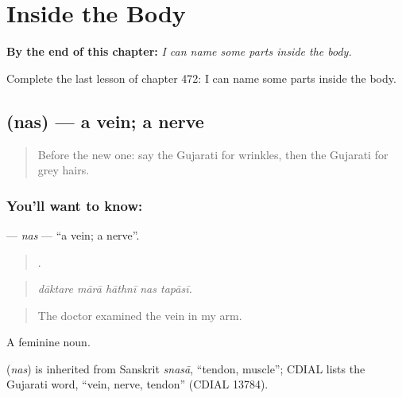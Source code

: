 
\chapter{Inside the Body}
\label{ch:gu-inside-the-body}

\begin{chapteropening}
\textbf{By the end of this chapter:} \emph{I can name some parts inside the body.}

Complete the last lesson of chapter 472: I can name some parts inside the body.
\end{chapteropening}

\section[\texorpdfstring{\gu{નસ} (nas)}{નસ (nas)}]{ (nas) — a vein; a nerve}

\label{lesson:GU-C472-nas}



\begin{quote}
Before the new one: say the Gujarati for wrinkles, then the Gujarati for grey hairs.
\end{quote}

\subsection*{You'll want to know: }
\textbf{} — \emph{nas} — \textquotedblleft{}a vein; a nerve\textquotedblright{}.

\begin{quote}
    .
\end{quote}

\begin{quote}
\emph{dāktare mārā hāthnī nas tapāsī.}
\end{quote}

\begin{quote}
The doctor examined the vein in my arm.
\end{quote}

A feminine noun.

\begin{cousinweb}
\textbf{} (\emph{nas}) is inherited from Sanskrit \emph{snasā}, \textquotedblleft{}tendon, muscle\textquotedblright{}; CDIAL lists the Gujarati word, \textquotedblleft{}vein, nerve, tendon\textquotedblright{} (CDIAL 13784).
\end{cousinweb}

